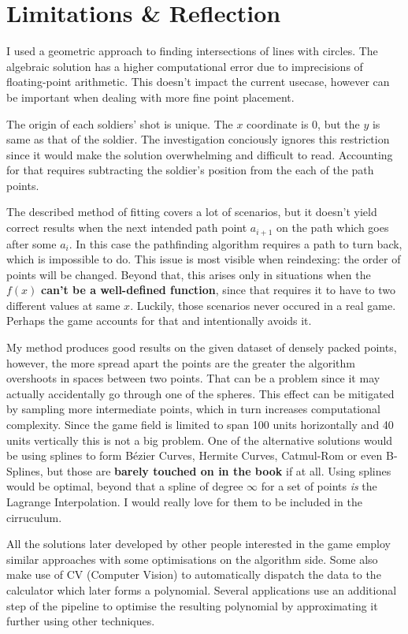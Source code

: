 \documentclass[12pt, titlepage]{article}
\begin{document}
\section{Limitations \& Reflection}
I used a geometric approach to finding intersections of lines with circles.
The algebraic solution has a higher computational error due to imprecisions 
of floating-point arithmetic. This doesn't impact the current usecase,
however can be important when dealing with more fine point placement.

The origin of each soldiers' shot is unique. The $x$ 
coordinate is $0$, but the $y$ is same as that of the soldier. The investigation
conciously ignores this restriction since it would make the solution overwhelming
and difficult to read. Accounting for that requires subtracting the soldier's 
position from the each of the path points.

The described method of fitting covers a lot of scenarios, but it doesn't yield 
correct results
when the next intended path point $a_{i + 1}$ on the path which goes after 
some $a_i$. In this case the pathfinding algorithm requires a path to turn back,
which is impossible to do. This issue is most visible when reindexing: the order
of points will be changed. Beyond that, this arises only in situations when the 
$f(x)$ \textbf{can't be a well-defined function}, since that requires it to have to
two different values at same $x$. Luckily, those scenarios never occured in a 
real game. Perhaps the game accounts for that and intentionally avoids it.

My method produces good results on the given dataset of densely packed points,
however, the more spread apart the points are the greater the algorithm
overshoots in spaces between two points. That can be a problem since it may 
actually accidentally go through one of the spheres. This effect can be
mitigated by sampling more intermediate points, which in turn increases 
computational complexity. Since the game field is  limited to span 100 units
horizontally and 40 units vertically this is not a big problem. One of the
alternative solutions would be using splines to form B\'{e}zier Curves, 
Hermite Curves, Catmul-Rom or even B-Splines, but those are \textbf{barely touched 
on in the book} if at all. Using splines would be optimal, beyond that
a spline of degree $\infty$ for a set of points \textit{is} the Lagrange
Interpolation. I would really love for them to be included in the cirruculum.

All the solutions later developed by other people interested in the game employ
similar approaches with some optimisations on the algorithm side. Some also
make use of CV (Computer Vision) to automatically dispatch the data to the
calculator which later forms a polynomial. Several applications use
an additional step of the pipeline to optimise the resulting polynomial
by approximating it further using other techniques.
\end{document}
